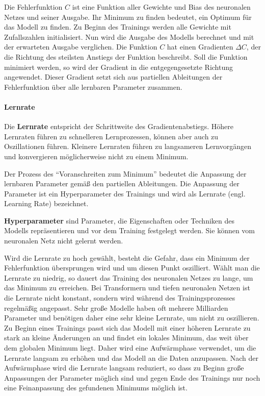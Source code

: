 Die Fehlerfunktion $C$ ist eine Funktion aller Gewichte und Bias des neuronalen Netzes und seiner Ausgabe.
Ihr Minimum zu finden bedeutet, ein Optimum für das Modell zu finden.
Zu Beginn des Trainings werden alle Gewichte mit Zufallszahlen initialisiert.
Nun wird die Ausgabe des Modells berechnet und mit der erwarteten Ausgabe verglichen.
Die Funktion $C$ hat einen Gradienten $\Delta C$, der die Richtung des steilsten Anstiegs der Funktion beschreibt.
Soll die Funktion minimiert werden, so wird der Gradient in die entgegengesetzte Richtung angewendet.
Dieser Gradient setzt sich aus partiellen Ableitungen der Fehlerfunktion über alle lernbaren Parameter zusammen.\\

\paragraph{Lernrate}
\begin{definition}\label{def:lernrate}
    Die \textbf{Lernrate} entspricht der Schrittweite des Gradientenabstiegs. Höhere Lernraten führen zu schnelleren Lernprozessen, können aber auch zu Oszillationen führen.
    Kleinere Lernraten führen zu langsameren Lernvorgängen und konvergieren möglicherweise nicht zu einem Minimum.
\end{definition}
Der Prozess des \enquote{Voranschreiten zum Minimum} bedeutet die Anpassung der lernbaren Parameter gemäß den partiellen Ableitungen.
Die Anpassung der Parameter ist ein Hyperparameter des Trainings und wird als Lernrate (engl. Learning Rate) bezeichnet.\\

\begin{definition}\label{def:hyperparameter}
    \textbf{Hyperparameter} sind Parameter, die Eigenschaften oder Techniken des Modells repräsentieren und vor dem Training festgelegt werden.
    Sie können vom neuronalen Netz nicht gelernt werden.
\end{definition}

Wird die Lernrate zu hoch gewählt, besteht die Gefahr, dass ein Minimum der Fehlerfunktion übersprungen wird und um diesen Punkt oszilliert.
Wählt man die Lernrate zu niedrig, so dauert das Training des neuronalen Netzes zu lange, um das Minimum zu erreichen.
Bei Transformern und tiefen neuronalen Netzen ist die Lernrate nicht konstant, sondern wird während des Trainingsprozesses regelmäßig angepasst.
Sehr große Modelle haben oft mehrere Milliarden Parameter und benötigen daher eine sehr kleine Lernrate, um nicht zu oszillieren.
Zu Beginn eines Trainings passt sich das Modell mit einer höheren Lernrate zu stark an kleine Änderungen an und findet ein lokales Minimum, das weit über dem globalen Minimum liegt.
Daher wird eine Aufwärmphase verwendet, um die Lernrate langsam zu erhöhen und das Modell an die Daten anzupassen.
Nach der Aufwärmphase wird die Lernrate langsam reduziert, so dass zu Beginn große Anpassungen der Parameter möglich sind und gegen Ende des Trainings nur noch eine Feinanpassung des gefundenen Minimums möglich ist.\\

